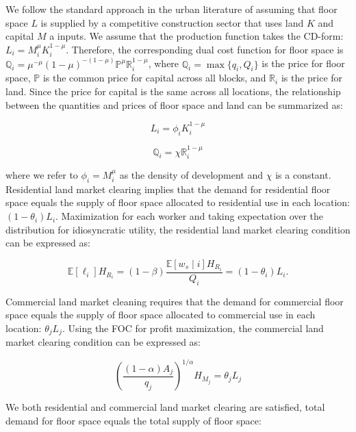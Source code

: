 We follow the standard approach in the urban literature of assuming that floor space $L$ is supplied by a competitive construction sector that uses land $K$ and capital $M$ a inputs. We assume that the production function takes the CD-form: $L_i = M_i^{\mu} K_i^{1 - \mu}$. Therefore, the corresponding dual cost function for floor space is $\mathbb{Q}_i = \mu^{-\mu}(1 - \mu)^{-(1 - \mu)} \mathbb{P}^{\mu} \mathbb{R}^{1 - \mu}_i$, where $\mathbb{Q}_i = \max\{q_i, Q_i\}$ is the price for floor space, $\mathbb{P}$ is the common price for capital across all blocks, and $\mathbb{R}_i$ is the price for land. Since the price for capital is the same across all locations, the relationship between the quantities and prices of floor space and land can be summarized as:

\begin{equation}
  L_i = \phi_i K_i^{1 - \mu}
\end{equation}

\begin{equation}
  \mathbb{Q}_i = \chi \mathbb{R}_i^{1 - \mu}
\end{equation}

where we refer to $\phi_i = M_i^{\mu}$ as the density of development and $\chi$ is a constant. Residential land market clearing implies that the demand for residential floor space equals the supply of floor space allocated to residential use in each location: $(1 - \theta_i)L_i$. Maximization for each worker and taking expectation over the distribution for idiosyncratic utility, the residential land market clearing condition can be expressed as:

\begin{equation}
  \mathbb{E}[\ell_i] H_{R_i} = (1 - \beta) \frac{\mathbb{E}[w_s \mid i] H_{R_i}}{Q_i} = (1 - \theta_i)L_i.
\end{equation}

Commercial land market cleaning requires that the demand for commercial floor space equals the supply of floor space allocated to commercial use in each location: $\theta_j L_j$. Using the FOC for profit maximization, the commercial land market clearing condition can be expressed as:

\begin{equation}
  (\frac{(1 - \alpha) A_j}{q_j})^{1/\alpha} H_{M_j} = \theta_j L_j
\end{equation}

We both residential and commercial land market clearing are satisfied, total demand for floor space equals the total supply of floor space:

